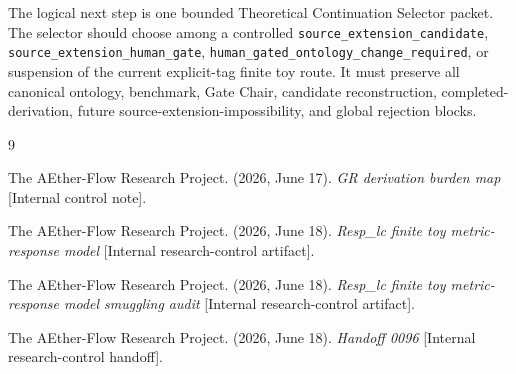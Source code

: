 \documentclass[11pt]{article}
\begin{document}
The logical next step is one bounded Theoretical Continuation Selector
packet. The selector should choose among a controlled
\texttt{source\_extension\_candidate}, \texttt{source\_extension\_human\_gate},
\texttt{human\_gated\_ontology\_change\_required}, or suspension of the
current explicit-tag finite toy route. It must preserve all canonical
ontology, benchmark, Gate Chair, candidate reconstruction,
completed-derivation, future source-extension-impossibility, and global
rejection blocks.

\begin{thebibliography}{9}

The AEther-Flow Research Project. (2026, June 17). \emph{GR derivation
burden map} [Internal control note].

The AEther-Flow Research Project. (2026, June 18). \emph{Resp\_lc
finite toy metric-response model} [Internal research-control artifact].

The AEther-Flow Research Project. (2026, June 18). \emph{Resp\_lc
finite toy metric-response model smuggling audit} [Internal
research-control artifact].

The AEther-Flow Research Project. (2026, June 18). \emph{Handoff 0096}
[Internal research-control handoff].

\end{thebibliography}
\end{document}

